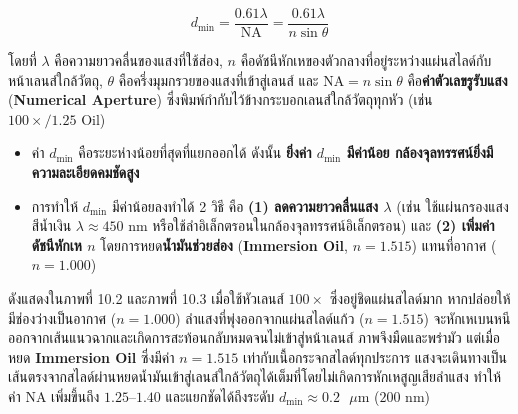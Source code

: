 \begin{equation}
    d_{\min} = \frac{0.61 \lambda}{\text{NA}} = \frac{0.61 \lambda}{n \sin\theta}
\end{equation}

โดยที่ $\lambda$ คือความยาวคลื่นของแสงที่ใช้ส่อง, $n$ คือดัชนีหักเหของตัวกลางที่อยู่ระหว่างแผ่นสไลด์กับหน้าเลนส์ใกล้วัตถุ, $\theta$ คือครึ่งมุมกรวยของแสงที่เข้าสู่เลนส์ และ $\text{NA} = n\sin\theta$ คือ\textbf{ค่าตัวเลขรูรับแสง} (\textbf{Numerical Aperture}) ซึ่งพิมพ์กำกับไว้ข้างกระบอกเลนส์ใกล้วัตถุทุกหัว (เช่น $100\times / 1.25\text{ Oil}$)

\begin{conceptbox}
\begin{itemize}
    \item ค่า $d_{\min}$ คือระยะห่างน้อยที่สุดที่แยกออกได้ ดังนั้น \textbf{ยิ่งค่า $d_{\min}$ มีค่าน้อย กล้องจุลทรรศน์ยิ่งมีความละเอียดคมชัดสูง}
    \item การทำให้ $d_{\min}$ มีค่าน้อยลงทำได้ 2 วิธี คือ \textbf{(1) ลดความยาวคลื่นแสง $\lambda$} (เช่น ใช้แผ่นกรองแสงสีน้ำเงิน $\lambda \approx 450\text{ nm}$ หรือใช้ลำอิเล็กตรอนในกล้องจุลทรรศน์อิเล็กตรอน) และ \textbf{(2) เพิ่มค่าดัชนีหักเห $n$} โดยการหยด\textbf{น้ำมันช่วยส่อง} (\textbf{Immersion Oil}, $n = 1.515$) แทนที่อากาศ ($n = 1.000$)
\end{itemize}
\end{conceptbox}

ดังแสดงใน\mbox{ภาพที่} 10.2 และ\mbox{ภาพที่} 10.3 เมื่อใช้หัวเลนส์ $100\times$ ซึ่งอยู่ชิดแผ่นสไลด์มาก หากปล่อยให้มีช่องว่างเป็นอากาศ ($n = 1.000$) ลำแสงที่พุ่งออกจากแผ่นสไลด์แก้ว ($n = 1.515$) จะหักเหเบนหนีออกจากเส้นแนวฉากและเกิดการสะท้อนกลับหมดจนไม่เข้าสู่หน้าเลนส์ ภาพจึงมืดและพร่ามัว แต่เมื่อหยด \textbf{Immersion Oil} ซึ่งมีค่า $n = 1.515$ เท่ากับเนื้อกระจกสไลด์ทุกประการ แสงจะเดินทางเป็นเส้นตรงจากสไลด์ผ่านหยดน้ำมันเข้าสู่เลนส์ใกล้วัตถุได้เต็มที่โดยไม่เกิดการหักเหสูญเสียลำแสง ทำให้ค่า $\text{NA}$ เพิ่มขึ้นถึง $1.25\text{--}1.40$ และแยกชัดได้ถึงระดับ $d_{\min} \approx 0.2\text{ }\mu\text{m}$ ($200\text{ nm}$)


